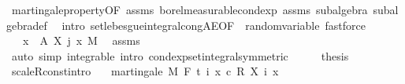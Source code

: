 \begin{isabellebody}
\ martingale{\isacharunderscore}{\kern0pt}property{\isacharbrackleft}{\kern0pt}OF\ assms{\isacharparenleft}{\kern0pt}{}{\isacharcomma}{\kern0pt}{}{\isacharparenright}{\kern0pt}{\isacharbrackright}{\kern0pt}\ borel{\isacharunderscore}{\kern0pt}measurable{\isacharunderscore}{\kern0pt}cond{\isacharunderscore}{\kern0pt}exp{\isacharprime}{\kern0pt}\ assms\ subalgebra\ subalgebra{\isacharunderscore}{\kern0pt}def\ \isamarkupfalse%
\ {\isacharparenleft}{\kern0pt}intro\ set{\isacharunderscore}{\kern0pt}lebesgue{\isacharunderscore}{\kern0pt}integral{\isacharunderscore}{\kern0pt}cong{\isacharunderscore}{\kern0pt}AE{\isacharbrackleft}{\kern0pt}OF\ {\isacharunderscore}{\kern0pt}\ random{\isacharunderscore}{\kern0pt}variable{\isacharbrackright}{\kern0pt}{\isacharparenright}{\kern0pt}\ fastforce{\isacharplus}{\kern0pt}\isanewline
\ \ \isamarkupfalse%
\ \isamarkupfalse%
\ {\isachardoublequoteopen}{\isachardot}{\kern0pt}{\isachardot}{\kern0pt}{\isachardot}{\kern0pt}\ {\isacharequal}{\kern0pt}\ {\isasymintegral}x\ {\isasymin}\ A{\isachardot}{\kern0pt}\ X\ j\ x\ {\isasympartial}M{\isachardoublequoteclose}\ \isamarkupfalse%
\ assms\ \isamarkupfalse%
\ {\isacharparenleft}{\kern0pt}auto\ simp{\isacharcolon}{\kern0pt}\ integrable\ intro{\isacharcolon}{\kern0pt}\ cond{\isacharunderscore}{\kern0pt}exp{\isacharunderscore}{\kern0pt}set{\isacharunderscore}{\kern0pt}integral{\isacharbrackleft}{\kern0pt}symmetric{\isacharbrackright}{\kern0pt}{\isacharparenright}{\kern0pt}\isanewline
\ \ \isamarkupfalse%
\ \isamarkupfalse%
\ {\isacharquery}{\kern0pt}thesis\ \isacommand{{\isachardot}{\kern0pt}}\isamarkupfalse%
\isanewline
{}\isamarkupfalse%
%
\endisatagproof
{\isafoldproof}%
%
\isadelimproof
\isanewline
%
\endisadelimproof
\isanewline
{}\isamarkupfalse%
\ scaleR{\isacharunderscore}{\kern0pt}const{\isacharbrackleft}{\kern0pt}intro{\isacharbrackright}{\kern0pt}{\isacharcolon}{\kern0pt}\isanewline
\ \ \ {\isachardoublequoteopen}martingale\ M\ F\ t\ {\isacharparenleft}{\kern0pt}{\isasymlambda}i\ x{\isachardot}{\kern0pt}\ c\ {\isacharasterisk}{\kern0pt}\isactrlsub R\ X\ i\ x{\isacharparenright}{\kern0pt}{\isachardoublequoteclose}\isanewline
%
\isadelimproof
%
\endisadelimproof
%
\isatagproof
{}\isamarkupfalse%
\ {\isacharminus}{\kern0pt}\isanewline
\ \ \isacommand{{\isacharbraceleft}{\kern0pt}}\isamarkupfalse%
\isanewline
\ \ \ \ \isamarkupfalse%

\end{isabellebody}
